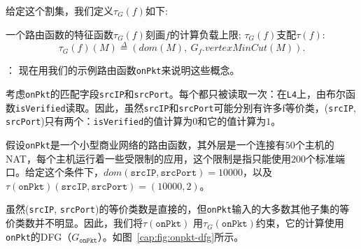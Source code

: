 给定这个割集，我们定义$\tau_G(f)$如下:



\begin{definition} 一个路由函数的特征函数$\tau_G(f)$刻画$f$的计算负载上限; $\tau_G(f)$支配$\tau(f)$:
\begin{equation*}
\tau_G(f)(M) \overset{\Delta}{=} (dom(M),\ G_f.vertexMinCut(M)).
\end{equation*}
\end{definition}

： 现在用我们的示例路由函数\texttt{onPkt}来说明这些概念。

考虑\texttt{onPkt}的匹配字段\texttt{srcIP}和\texttt{srcPort}。每个都只被读取一次：在\texttt{L4}上，由布尔函数\texttt{isVerified}读取。因此，虽然\texttt{srcIP}和\texttt{srcPort}可能分别有许多f等价类，(\texttt{srcIP}, \texttt{srcPort})只有两个：\texttt{isVerified}的值计算为$0$和它的值计算为$1$。

假设\texttt{onPkt}是一个小型商业网络的路由函数，其外层是一个连接有$50$个主机的NAT，每个主机运行着一些受限制的应用，这个限制是指只能使用$200$个标准端口。给定这个条件下，$dom(\texttt{srcIP}, \texttt{srcPort}) = 10000$，以及$\tau(\texttt{onPkt})(\texttt{srcIP}, \texttt{srcPort}) = (10000, 2)$。

虽然(\texttt{srcIP}, \texttt{srcPort})的等价类数是直接的，但\texttt{onPkt}输入的大多数其他子集的等价类数并不明显。因此，我们将$\tau(\texttt{onPkt})$ 用$\tau_G(\texttt{onPkt})$约束，它的计算使用\texttt{onPkt}的DFG（$G_{\texttt{onPkt}}$）。如图~\ref{cap:fig:onpkt-dfg}所示。



